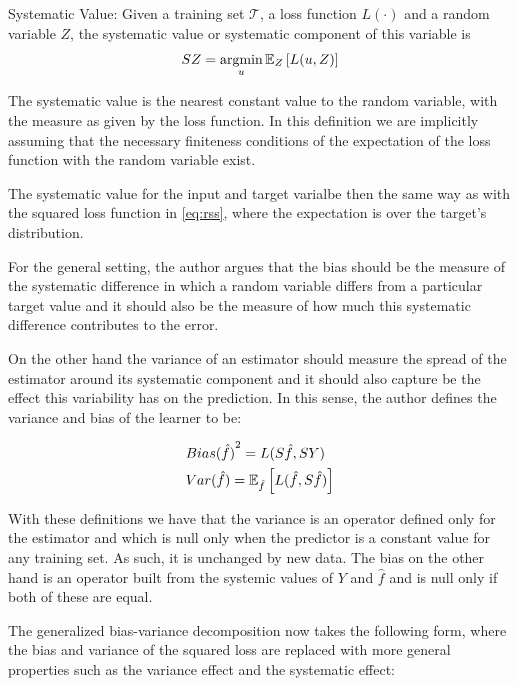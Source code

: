 \begin{appendices}
\begin{definition}{Systematic Value:}
Given a training set $\mathcal{T}$, a loss function $L(\cdot)$ and a random variable $Z$, the systematic value or systematic component of this variable is
$$ SZ =  \operatorname*{argmin}_u \operatorname{\mathbb{E}}_{Z} \left[ L(u,Z) \right]$$
\end{definition}

The systematic value is the nearest constant value to the random variable, with the measure as given by the loss function.
In this definition we are implicitly assuming that the necessary finiteness conditions of the expectation of the loss function with the random variable exist.

The systematic value for the input and target varialbe then the same way as with the squared loss function in \cref{eq:rss}, where the expectation is over the target's distribution.

For the general setting, the author argues that the bias should be the measure of the systematic difference in which a random variable differs from a particular target value and it should also be the measure of how much this systematic difference contributes to the error.

On the other hand the variance of an estimator should measure the spread of the estimator around its systematic component and it should also capture be the effect this variability has on the prediction.
In this sense, the author defines the variance and bias of the learner to be:

\begin{equation}
\begin{split}
& {Bias(\hat{f})}^2 = L(S\hat{f},SY) \\
& Var(\hat{f}) = \operatorname{\mathbb{E}}_{\hat{f}} \left[ L(\hat{f} , S\hat{f}) \right]
\end{split}
\end{equation}

With these definitions we have that the variance is an operator defined only for the estimator and which is null only when the predictor is a constant value for any training set.
As such, it is unchanged by new data.
The bias on the other hand is an operator built from the systemic values of $Y$ and $\hat{f}$ and is null only if both of these are equal.

The generalized bias-variance decomposition now takes the following form, where the bias and variance of the squared loss are replaced with more general properties such as the variance effect and the systematic effect:


\end{appendices}
